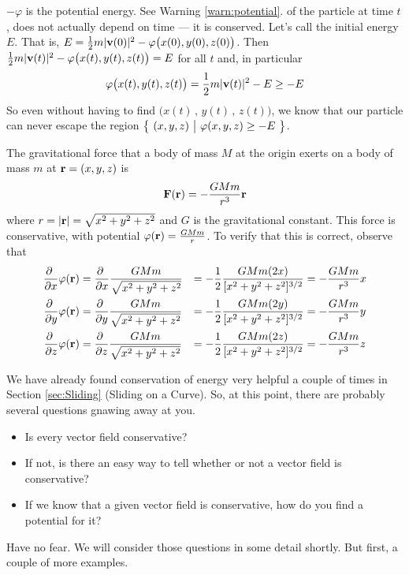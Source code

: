 \begin{eg}
{$-\varphi$ is the potential energy. See Warning \ref{warn:potential}.}  of the 
particle at time $t$, does not actually depend on time --- it is conserved.
Let's call the initial energy $E$. That is,
$E=\frac{1}{2} m |\mathbf{v}(0)|^2 -\varphi\big(x(0),y(0),z(0)\big)$.
Then $\frac{1}{2} m |\mathbf{v}(t)|^2 -\varphi\big(x(t),y(t),z(t)\big)=E$
for all $t$ and, in particular
\begin{equation*}
\varphi\big(x(t),y(t),z(t)\big) = \frac{1}{2} m |\mathbf{v}(t)|^2 -E
             \ge -E
\end{equation*}
So even without having to find $\big(x(t)\,,\,y(t)\,,\,z(t)\big)$,
we know that our particle can never escape the region 
$\big\{ \ (x,y,z)\ \big|\ \varphi(x,y,z)\ge -E\ \big\}$.
\end{eg}


\begin{eg}[Gravity]\label{eg:gravity}
The gravitational force that a body of mass $M$ at the origin
exerts on a body of mass $m$ at $\mathbf{r}=(x,y,z)$ is
\begin{equation*}
\mathbf{F}(\mathbf{r}) = -\frac{GMm}{r^3}\mathbf{r}
\end{equation*}
where $r=|\mathbf{r}|=\sqrt{x^2+y^2+z^2}$ and $G$ is the gravitational constant.
This force is conservative, with potential $\varphi(\mathbf{r}) = \frac{GMm}{r}$. 
To verify that this is correct, observe that
\begin{alignat*}{3}
\frac{\partial\ }{\partial x}\varphi(\mathbf{r})
   &=\frac{\partial\ }{\partial x}\frac{GMm}{\sqrt{x^2+y^2+z^2}}
   &=-\frac{1}{2}\frac{GMm(2x)}{[x^2+y^2+z^2]^{3/2}} 
   &=-\frac{GMm}{r^3}x \\ 
\frac{\partial\ }{\partial y}\varphi(\mathbf{r})
   &=\frac{\partial\ }{\partial y}\frac{GMm}{\sqrt{x^2+y^2+z^2}}
   &=-\frac{1}{2}\frac{GMm(2y)}{[x^2+y^2+z^2]^{3/2}} 
   &=-\frac{GMm}{r^3}y \\ 
\frac{\partial\ }{\partial z}\varphi(\mathbf{r})
   &=\frac{\partial\ }{\partial z}\frac{GMm}{\sqrt{x^2+y^2+z^2}}
   &=-\frac{1}{2}\frac{GMm(2z)}{[x^2+y^2+z^2]^{3/2}} 
   &=-\frac{GMm}{r^3}z  
\end{alignat*}
\end{eg}

We have already found conservation of energy very helpful 
a couple of times in Section \ref{sec:Sliding} (Sliding on a Curve).
So, at this point, there are probably several questions gnawing away at you.
\begin{itemize}
\item
Is every vector field conservative?

\item
If not, is there an easy way to tell whether or not a vector field 
is conservative?

\item
If we know that a given vector field is conservative, how do you find a potential for it?

\end{itemize}
Have no fear. We will consider those questions in some detail shortly.
But first, a couple of more examples. 



